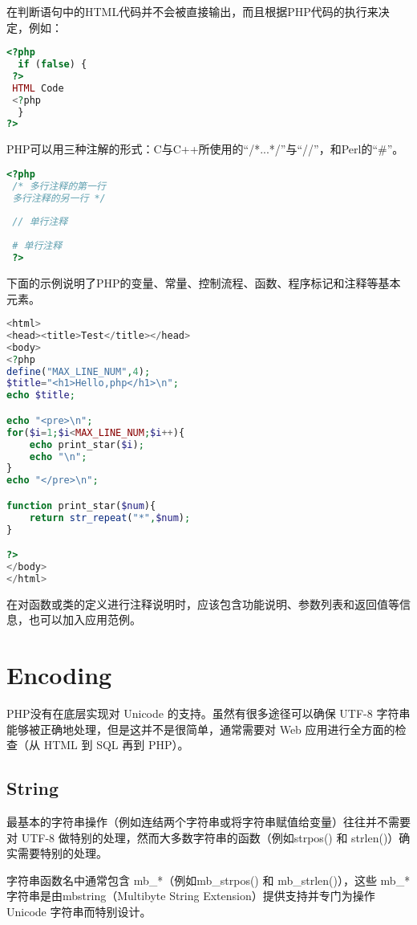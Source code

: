在判断语句中的HTML代码并不会被直接输出，而且根据PHP代码的执行来决定，例如：


\begin{lstlisting}[language=PHP]
<?php
  if (false) {
 ?>
 HTML Code
 <?php
  }
?>
\end{lstlisting}

PHP可以用三种注解的形式：C与C++所使用的“/*...*/”与“//”，和Perl的“\#”。

\begin{lstlisting}[language=PHP]
 <?php
 /* 多行注释的第一行
 多行注释的另一行 */
 
 // 单行注释
 
 # 单行注释
 ?>
\end{lstlisting}


下面的示例说明了PHP的变量、常量、控制流程、函数、程序标记和注释等基本元素。



\begin{lstlisting}[language=PHP]
<html>
<head><title>Test</title></head>
<body>
<?php
define("MAX_LINE_NUM",4);
$title="<h1>Hello,php</h1>\n";
echo $title;

echo "<pre>\n";
for($i=1;$i<MAX_LINE_NUM;$i++){
    echo print_star($i);
    echo "\n";
}
echo "</pre>\n";

function print_star($num){
    return str_repeat("*",$num);
}

?>
</body>
</html>
\end{lstlisting}

在对函数或类的定义进行注释说明时，应该包含功能说明、参数列表和返回值等信息，也可以加入应用范例。


\chapter{Encoding}

PHP没有在底层实现对 Unicode 的支持。虽然有很多途径可以确保 UTF-8 字符串能够被正确地处理，但是这并不是很简单，通常需要对 Web 应用进行全方面的检查（从 HTML 到 SQL 再到 PHP）。


\section{String}


最基本的字符串操作（例如连结两个字符串或将字符串赋值给变量）往往并不需要对 UTF-8 做特别的处理，然而大多数字符串的函数（例如strpos() 和 strlen()）确实需要特别的处理。

字符串函数名中通常包含 mb\_*（例如mb\_strpos() 和 mb\_strlen()），这些 mb\_* 字符串是由mbstring（Multibyte String Extension）提供支持并专门为操作 Unicode 字符串而特别设计。

